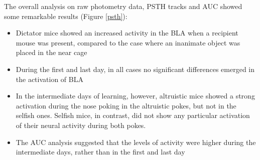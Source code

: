 \documentclass[12pt, a4paper]{article}
\begin{document}
The overall analysis on raw photometry data, PSTH tracks and AUC showed some remarkable results (Figure \ref{psth}):

\begin{itemize}
	
	\item Dictator mice showed an increased activity in the BLA when a recipient mouse was present, compared to the case where an inanimate object was placed in the near cage
	
	\item During the first and last day, in all cases no significant differences emerged in the activation of BLA
	
	\item In the intermediate days of learning, however, altruistic mice showed a strong activation during the nose poking in the altruistic pokes, but not in the selfish ones. Selfish mice, in contrast, did not show any particular activation of their neural activity during both pokes. 
	
	\item The AUC analysis suggested that the levels of activity were higher during the intermediate days, rather than in the first and last day
\end{itemize}
\end{document}
